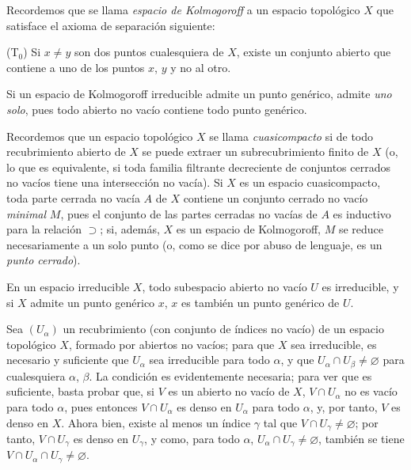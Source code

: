\begin{env}[2.1.3]
\label{0.2.1.3-fr}
Recordemos que se llama \emph{espacio de Kolmogoroff} a un espacio topológico $X$
que satisface el axioma de separación siguiente:

\smallskip
\noindent
\textup{(T$_0$)} Si $x\neq y$ son dos puntos cualesquiera de $X$, existe
un conjunto abierto que contiene a uno de los puntos $x$, $y$ y no al otro.

Si un espacio de Kolmogoroff irreducible admite un punto genérico, admite
\emph{uno solo}, pues todo abierto no vacío contiene todo punto
genérico.

Recordemos que un espacio topológico $X$ se llama \emph{cuasicompacto} si de todo
recubrimiento abierto de $X$ se puede extraer un subrecubrimiento finito de $X$ (o,
lo que es equivalente, si toda familia filtrante decreciente de conjuntos
cerrados no vacíos tiene una intersección no vacía). Si $X$ es un espacio
cuasicompacto, toda parte cerrada no vacía $A$ de $X$ contiene un conjunto
cerrado no vacío \emph{minimal} $M$, pues el conjunto de las partes cerradas no vacías
de $A$ es inductivo para la relación $\supset$; si, además, $X$ es un espacio
de Kolmogoroff, $M$ se reduce necesariamente a un solo punto (o, como se
dice por abuso de lenguaje, es un \emph{punto cerrado}).
\end{env}

\begin{env}[2.1.4]
\label{0.2.1.4-fr}
En un espacio irreducible $X$, todo subespacio abierto no vacío $U$ es
irreducible, y si $X$ admite un punto genérico $x$, $x$ es también un punto
genérico de $U$.

Sea $(U_\alpha)$ un recubrimiento (con conjunto de índices no vacío) de un
espacio topológico $X$, formado por abiertos no vacíos; para que $X$ sea
irreducible, es necesario y suficiente que $U_\alpha$ sea irreducible para todo
$\alpha$, y que $U_\alpha\cap U_\beta\neq\varnothing$ para cualesquiera
$\alpha$, $\beta$. La condición es evidentemente necesaria; para ver que
es suficiente, basta probar que, si $V$ es un abierto no vacío de $X$,
$V\cap U_\alpha$ no es vacío para todo $\alpha$, pues entonces $V\cap U_\alpha$
es denso en $U_\alpha$ para todo $\alpha$, y, por tanto, $V$ es denso en
$X$. Ahora bien, existe al menos un índice $\gamma$ tal que
$V\cap U_\gamma\neq\varnothing$; por tanto, $V\cap U_\gamma$ es denso en
$U_\gamma$, y como, para todo $\alpha$,
$U_\alpha\cap U_\gamma\neq\varnothing$, también se tiene
$V\cap U_\alpha\cap U_\gamma\neq\varnothing$.
\end{env}
